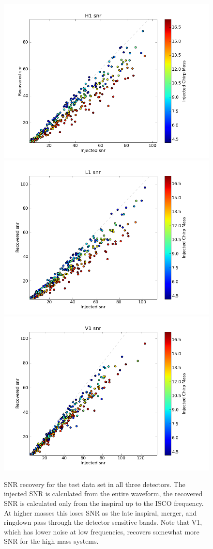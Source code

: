 \begin{figure}
  \includegraphics[width=0.5\linewidth]{figures/ninja2_results/h1_snrs_second}
  \includegraphics[width=0.5\linewidth]{figures/ninja2_results/l1_snrs_second} \\
  \includegraphics[width=0.5\linewidth]{figures/ninja2_results/v1_snrs_second}
  \caption[SNR recovery for the test data set]{
  \label{f:test_recovered_snr}
SNR recovery for the test data set in all three detectors.  The
injected SNR is calculated from the entire waveform, the recovered SNR
is calculated only from the inspiral up to the ISCO frequency.  At
higher masses this loses SNR as the late inspiral, merger, and
ringdown pass through the detector sensitive bands.  Note that V1,
which has lower noise at low frequencies, recovers somewhat more SNR
for the high-mass systems.
}
\end{figure}%


